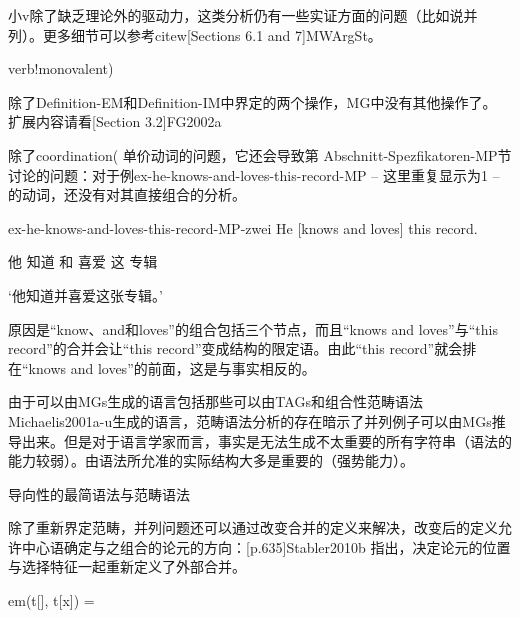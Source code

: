 小v除了缺乏理论外的驱动力，这类分析仍有一些实证方面的问题（比如说并列）。更多细节可以参考citew[Sections 6.1 and 7]MWArgSt。



verb!monovalent)  

除了Definition-EM和Definition-IM中界定的两个操作，MG中没有其他操作了。 
扩展内容请看[Section 3.2]FG2002a









除了coordination( 单价动词的问题，它还会导致第 Abschnitt-Spezfikatoren-MP节讨论的问题：对于例ex-he-knows-and-loves-this-record-MP -- 这里重复显示为1 -- 的动词，还没有对其直接组合的分析。




ex-he-knows-and-loves-this-record-MP-zwei
He [knows and loves] this record.

他 知道 和 喜爱 这 专辑

`他知道并喜爱这张专辑。'




原因是“know、and和loves”的组合包括三个节点，而且“knows and loves”与“this record”的合并会让“this record”变成结构的限定语。由此“this record”就会排在“knows and loves”的前面，这是与事实相反的。






由于可以由MGs生成的语言包括那些可以由TAGs和组合性范畴语法Michaelis2001a-u生成的语言，范畴语法分析的存在暗示了并列例子可以由MGs推导出来。但是对于语言学家而言，事实是无法生成不太重要的所有字符串（语法的能力较弱）。由语法所允准的实际结构大多是重要的（强势能力）。








导向性的最简语法与范畴语法

除了重新界定范畴，并列问题还可以通过改变合并的定义来解决，改变后的定义允许中心语确定与之组合的论元的方向：[p.635]Stabler2010b 指出，决定论元的位置与选择特征一起重新定义了外部合并。







em(t[], t[x]) = 














